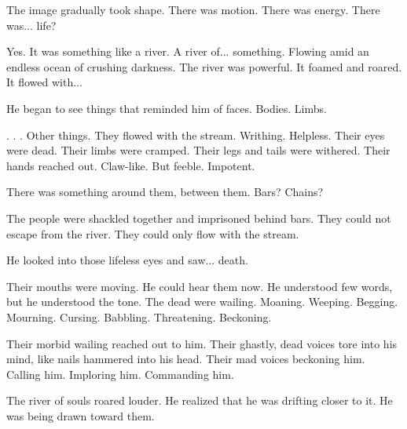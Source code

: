 
The image gradually took shape. 
There was motion. 
There was energy. 
There was... life? 


Yes. 
It was something like a river. 
A river of... something. 
Flowing amid an endless ocean of crushing darkness. 
The river was powerful. 
It foamed and roared. 
It flowed with...


He began to see things that reminded him of faces. 
Bodies. 
Limbs. 


\Scathae. 
\Meccara.
\Humans. 
Other things. 
They flowed with the stream. 
Writhing. 
Helpless. 
Their eyes were dead. 
Their limbs were cramped. 
Their legs and tails were withered. 
Their hands reached out. 
Claw-like. 
But feeble. 
Impotent. 

There was something around them, between them. 
Bars? 
Chains?


The people were shackled together and imprisoned behind bars. 
They could not escape from the river. 
They could only flow with the stream. 


He looked into those lifeless eyes and saw... death. 


Their mouths were moving. 
He could hear them now. 
He understood few words, but he understood the tone. 
The dead were wailing. 
Moaning. 
Weeping. 
Begging. 
Mourning. 
Cursing. 
Babbling. 
Threatening. 
Beckoning. 


Their morbid wailing reached out to him. 
Their ghastly, dead voices tore into his mind, like nails hammered into his head. 
Their mad voices beckoning him. 
Calling him. 
Imploring him. 
Commanding him. 


The river of souls roared louder. 
He realized that he was drifting closer to it. 
He was being drawn toward them. 


